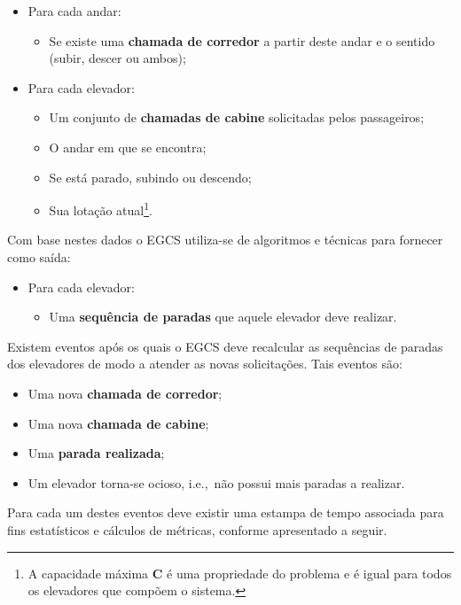 \begin{itemize}
  \item Para cada andar:
  \begin{itemize}
    \item Se existe uma \textbf{chamada de corredor} a partir deste andar e o
          sentido (subir, descer ou ambos);
  \end{itemize}
  \item Para cada elevador:
  \begin{itemize}
    \item Um conjunto de \textbf{chamadas de cabine} solicitadas pelos
          passageiros;
    \item O andar em que se encontra;
    \item Se está parado, subindo ou descendo;
    \item Sua lotação atual\footnote{A capacidade máxima \textbf{C} é uma
          propriedade do problema e é igual para todos os elevadores que compõem
          o sistema.}.
  \end{itemize}
\end{itemize}

Com base nestes dados o EGCS utiliza-se de algoritmos e técnicas para fornecer como
saída:

\begin{itemize}
  \item Para cada elevador:
  \begin{itemize}
    \item Uma \textbf{sequência de paradas} que aquele elevador deve realizar.
  \end{itemize}
\end{itemize}

Existem eventos após os quais o EGCS deve recalcular as sequências de paradas
dos elevadores de modo a atender as novas solicitações. Tais eventos são:

\begin{itemize}
  \item Uma nova \textbf{chamada de corredor};
  \item Uma nova \textbf{chamada de cabine};
  \item Uma \textbf{parada realizada};
  \item Um elevador torna-se ocioso, i.e.,~não possui mais paradas a realizar.
\end{itemize}

Para cada um destes eventos deve existir uma estampa de tempo associada para
fins estatísticos e cálculos de métricas, conforme apresentado a seguir.

